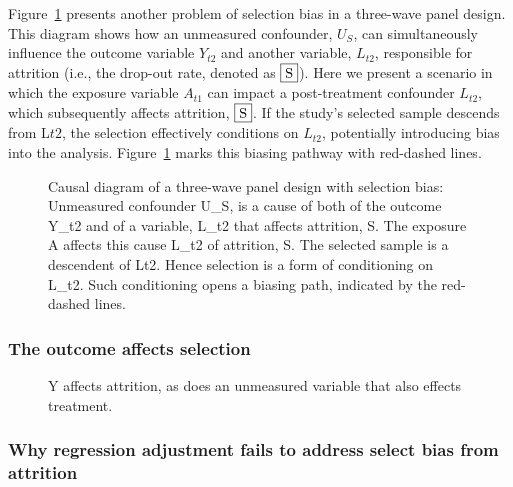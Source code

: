\documentclass[
  singlecolumn,
  9pt]{article}
\begin{document}
Figure~\ref{fig-5} presents another problem of selection bias in a
three-wave panel design. This diagram shows how an unmeasured
confounder, \(U_S\), can simultaneously influence the outcome variable
\(Y_{t2}\) and another variable, \(L_{t2}\), responsible for attrition
(i.e., the drop-out rate, denoted as \(\framebox{S}\)). Here we present
a scenario in which the exposure variable \(A_{t1}\) can impact a
post-treatment confounder \(L_{t2}\), which subsequently affects
attrition, \(\framebox{S}\). If the study's selected sample descends
from L\({t2}\), the selection effectively conditions on \(L_{t2}\),
potentially introducing bias into the analysis. Figure~\ref{fig-5} marks
this biasing pathway with red-dashed lines.

\begin{figure}


\caption{\label{fig-5}Causal diagram of a three-wave panel design with
selection bias: Unmeasured confounder U\_S, is a cause of both of the
outcome Y\_t2 and of a variable, L\_t2 that affects attrition, S. The
exposure A affects this cause L\_t2 of attrition, S. The selected sample
is a descendent of Lt2. Hence selection is a form of conditioning on
L\_t2. Such conditioning opens a biasing path, indicated by the
red-dashed lines.}

\end{figure}%

\subsubsection{The outcome affects
selection}\label{the-outcome-affects-selection}

\begin{figure}


\caption{\label{fig-6}Y affects attrition, as does an unmeasured
variable that also effects treatment.}

\end{figure}%

\subsubsection{Why regression adjustment fails to address select bias
from
attrition}\label{why-regression-adjustment-fails-to-address-select-bias-from-attrition}
\end{document}
